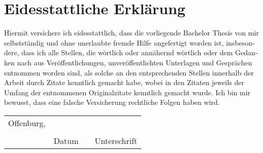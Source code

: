 %
%
%                     
%
%
%
\section*{Eidesstattliche Erklärung}
%
\foreignlanguage{ngerman}{
Hiermit  versichere  ich  eidesstattlich,  dass  die  vorliegende  Bachelor
Thesis von mir selbstständig und ohne unerlaubte fremde Hilfe angefertigt worden
ist, insbesondere, dass ich alle Stellen, die wörtlich oder  
annähernd wörtlich oder dem Gedanken nach aus Veröffentlichungen,
unveröffentlichten Unterlagen und Gesprächen entnommen worden sind,
als solche an den entsprechenden Stellen innerhalb der Arbeit durch Zitate
kenntlich gemacht habe, 
wobei in den Zitaten jeweils der Umfang der entnommenen Originalzitate kenntlich
gemacht wurde. 
Ich  bin  mir  bewusst,  dass  eine  falsche  Versicherung  rechtliche Folgen
haben wird.} 


\newcommand{\mysignatureblock}[3]{%
  \begin{tabular}{llp{2em}l} 
  #1 & \hspace{4cm}        & & \hspace{4cm} \\\cline{2-2}\cline{4-4}
     &                     & & \\[-3mm]
     & {\footnotesize #2}  & & {\footnotesize #3}
  \end{tabular}
}

\mysignatureblock{Offenburg,}{Datum}{Unterschrift}


\newpage
\newpage
